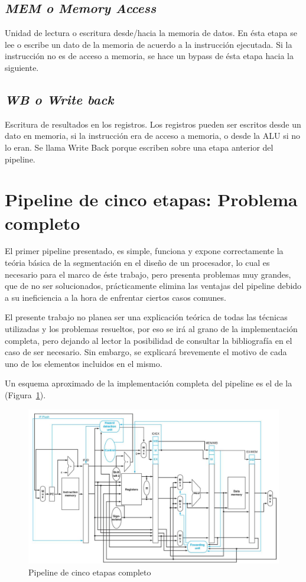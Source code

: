 \documentclass[12pt]{article}
\begin{document}
\subsection{\textit{MEM o Memory Access}} 
Unidad de lectura o escritura desde/hacia la memoria de datos. En ésta etapa se lee o escribe un dato de la memoria de acuerdo a la instrucción ejecutada. Si la instrucción no es de acceso a memoria, se hace un bypass de ésta etapa hacia la siguiente.

\subsection{\textit{WB o Write back}} 
Escritura de resultados en los registros. Los registros pueden ser escritos desde un dato en memoria, si la instrucción era de acceso a memoria, o desde la ALU si no lo eran. Se llama Write Back porque escriben sobre una etapa anterior del pipeline.

\section{Pipeline de cinco etapas: Problema completo}

El primer pipeline presentado, es simple, funciona y expone correctamente la teória básica de la segmentación en el diseño de un procesador, lo cual es necesario para el marco de éste trabajo, pero presenta problemas muy grandes, que de no ser solucionados, prácticamente elimina las ventajas del pipeline debido a su ineficiencia a la hora de enfrentar ciertos casos comunes.

El presente trabajo no planea ser una explicación teórica de todas las técnicas utilizadas y los problemas resueltos, por eso se irá al grano de la implementación completa, pero dejando al lector la posibilidad de consultar la bibliografía en el caso de ser necesario. Sin embargo, se explicará brevemente el motivo de cada uno de los elementos incluidos en el mismo.

Un esquema aproximado de la implementación completa del pipeline es el de la (Figura~\ref{fig:pipelinecompleto}).

\begin{figure}[ht]
\centering
\includegraphics[width=.9\textwidth]{imagenes/esquema_pipeline_completo.jpeg}
\caption{Pipeline de cinco etapas completo \cite{patterson}}
\label{fig:pipelinecompleto}
\end{figure}
\end{document}
